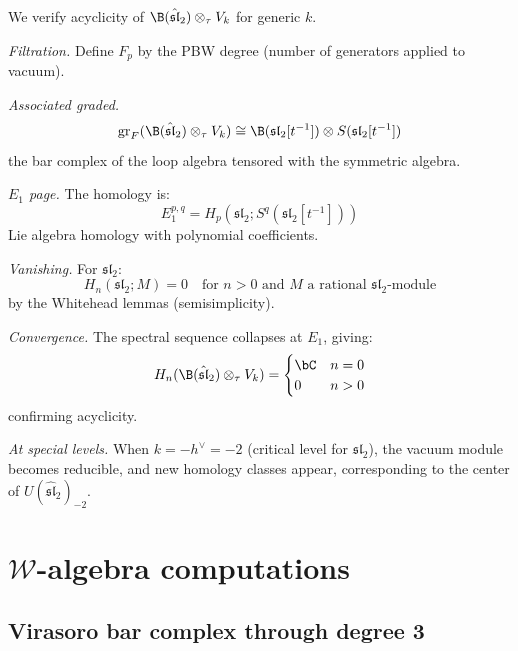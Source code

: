 \begin{computation}\label{comp:km-acyclic}
We verify acyclicity of $\B(\hat{\mathfrak{sl}}_2) \otimes_\tau V_k$ for generic $k$.

\emph{Filtration.} Define $F_p$ by the PBW degree (number of generators applied to vacuum).

\emph{Associated graded.}
\[
\mathrm{gr}_F(\B(\hat{\mathfrak{sl}}_2) \otimes_\tau V_k) \cong \B(\mathfrak{sl}_2[t^{-1}]) \otimes S(\mathfrak{sl}_2[t^{-1}])
\]
the bar complex of the loop algebra tensored with the symmetric algebra.

\emph{$E_1$ page.} The homology is:
\[
E_1^{p,q} = H_p(\mathfrak{sl}_2; S^q(\mathfrak{sl}_2[t^{-1}]))
\]
Lie algebra homology with polynomial coefficients.

\emph{Vanishing.} For $\mathfrak{sl}_2$:
\[
H_n(\mathfrak{sl}_2; M) = 0 \quad \text{for } n > 0 \text{ and } M \text{ a rational } \mathfrak{sl}_2\text{-module}
\]
by the Whitehead lemmas (semisimplicity).

\emph{Convergence.} The spectral sequence collapses at $E_1$, giving:
\[
H_n(\B(\hat{\mathfrak{sl}}_2) \otimes_\tau V_k) = \begin{cases}
\bC & n = 0 \\
0 & n > 0
\end{cases}
\]
confirming acyclicity.

\emph{At special levels.} When $k = -h^\vee = -2$ (critical level for $\mathfrak{sl}_2$), 
the vacuum module becomes reducible, and new homology classes appear, corresponding 
to the center of $U(\hat{\mathfrak{sl}}_2)_{-2}$.
\end{computation}


\section{$\mathcal{W}$-algebra computations}
\label{sec:w-algebra-details}

\subsection{Virasoro bar complex through degree 3}

